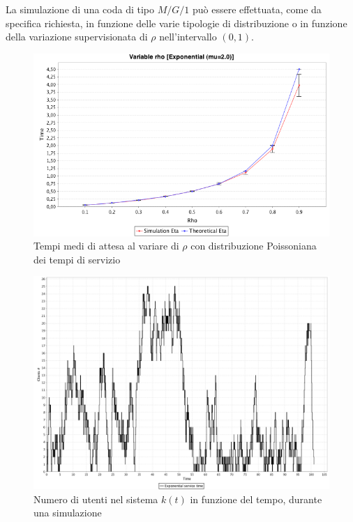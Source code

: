 La simulazione di una coda di tipo $M/G/1$ pu\`o essere effettuata, come da specifica richiesta, in funzione delle varie tipologie di distribuzione o in funzione della variazione supervisionata di $\rho$ nell'intervallo $(0,1)$.

\begin{figure}[!h]{
	\begin{center}
	   \includegraphics[width=\textwidth]{figures/mg1expmu2.png}
	\end{center}}
	\caption{Tempi medi di attesa al variare di $\rho$ con distribuzione Poissoniana dei tempi di servizio}
	\label{fig:mg1expmu2}
\end{figure}

\begin{figure}[!h]{
	\begin{center}
	   \includegraphics[width=\textwidth]{figures/kt.png}
	\end{center}}
	\caption{Numero di utenti nel sistema $k(t)$ in funzione del tempo, durante una simulazione}
	\label{fig:kt}
\end{figure}

